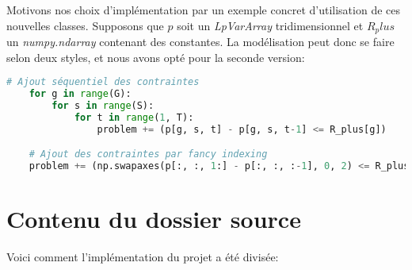 Motivons nos choix d'implémentation par un exemple concret d'utilisation de ces nouvelles classes.
Supposons que $p$ soit un \textit{LpVarArray} tridimensionnel et $R_plus$ un \textit{numpy.ndarray} contenant 
des constantes. La modélisation peut donc se faire selon deux styles, et nous avons opté pour la seconde
version:
\begin{lstlisting}[language=Python]
    # Ajout séquentiel des contraintes
    for g in range(G):
        for s in range(S):
            for t in range(1, T):
                problem += (p[g, s, t] - p[g, s, t-1] <= R_plus[g])

    # Ajout des contraintes par fancy indexing
    problem += (np.swapaxes(p[:, :, 1:] - p[:, :, :-1], 0, 2) <= R_plus)
\end{lstlisting}

\section{Contenu du dossier source}

Voici comment l'implémentation du projet a été divisée:

